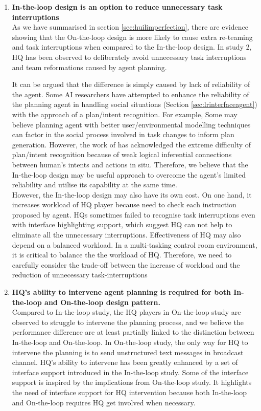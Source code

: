 \begin{enumerate}
\item \textbf{In-the-loop design is an option to reduce unnecessary task interruptions} \\
As we have summarised in section \ref{sec:huilimperfection}, there are evidence showing that the On-the-loop design is more likely to cause extra re-teaming and task interruptions when compared to the In-the-loop design. In study 2, HQ has been observed to deliberately avoid unnecessary task interruptions and team reformations caused by agent planning. 

It can be argued that the difference is simply caused by lack of reliability of the agent. Some AI researchers have attempted to enhance the reliability of the planning agent in handling social situations (Section \ref{sec:lrinterfaceagent}) with the approach of a plan/intent recognition. For example, Some may believe planning agent with better user/environmental modelling techniques can factor in the social process involved in task changes to inform plan generation. However, the work of \cite{Suchman1987} has acknowledged the extreme difficulty of plan/intent recognition because of weak logical inferential connections between human's intents and actions in situ. Therefore, we believe that the In-the-loop design may be useful approach to overcome the agent's limited reliability and utilise its capability at the same time.\\

However, the In-the-loop design may also have its own cost. On one hand, it increases workload of HQ player because need to check each instruction proposed by agent. HQs sometimes failed to recognise task interruptions even with interface highlighting support, which suggest HQ can not help to eliminate all the unnecessary interruptions. Effectiveness of HQ may also depend on a balanced workload. In a multi-tasking control room environment, it is critical to balance the the workload of HQ. Therefore, we need to carefully consider the trade-off between the increase of workload and the reduction of unnecessary task-interruptions \\

\item \textbf{HQ's ability to intervene agent planning is required for both In-the-loop and On-the-loop design pattern.}\\
Compared to In-the-loop study, the HQ players in On-the-loop study are observed to struggle to intervene the planning process, and we believe the performance difference are at least partially linked to the distinction between In-the-loop and On-the-loop. In On-the-loop study, the only way for HQ to intervene the planning is to send unstructured text messages in broadcast channel. HQ's ability to intervene has been greatly enhanced by a set of interface support introduced in the In-the-loop study. Some of the interface support is inspired by the implications from On-the-loop study. It highlights the need of interface support for HQ intervention because both In-the-loop and On-the-loop requires HQ get involved when necessary. \\


\end{enumerate}
